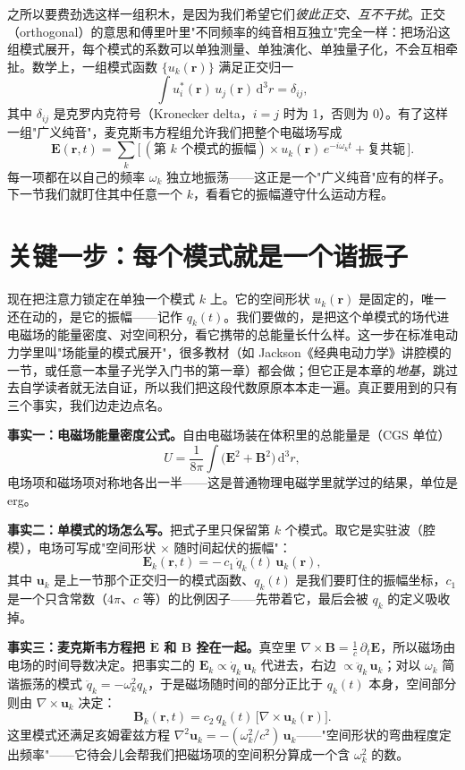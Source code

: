 之所以要费劲选这样一组积木，是因为我们希望它们\emph{彼此正交、互不干扰}。正交（orthogonal）的意思和傅里叶里"不同频率的纯音相互独立"完全一样：把场沿这组模式展开，每个模式的系数可以单独测量、单独演化、单独量子化，不会互相牵扯。数学上，一组模式函数 \(\{u_k(\bm r)\}\) 满足正交归一
\[
  \int u_i^*(\bm r)\,u_j(\bm r)\,\mathrm d^3r=\delta_{ij},
\]
其中 \(\delta_{ij}\) 是克罗内克符号（Kronecker delta，\(i=j\) 时为 1，否则为 0）。有了这样一组"广义纯音"，麦克斯韦方程组允许我们把整个电磁场写成
\[
  \bm E(\bm r,t)=\sum_k\big[\,(\text{第 }k\text{ 个模式的振幅})\times u_k(\bm r)\,e^{-i\omega_k t}+\text{复共轭}\,\big].
\]
每一项都在以自己的频率 \(\omega_k\) 独立地振荡——这正是一个"广义纯音"应有的样子。下一节我们就盯住其中任意一个 \(k\)，看看它的振幅遵守什么运动方程。

\section{关键一步：每个模式就是一个谐振子}
\label{sec:e05-mode-is-oscillator}

现在把注意力锁定在单独一个模式 \(k\) 上。它的空间形状 \(u_k(\bm r)\) 是固定的，唯一还在动的，是它的振幅——记作 \(q_k(t)\)。我们要做的，是把这个单模式的场代进电磁场的能量密度、对空间积分，看它携带的总能量长什么样。这一步在标准电动力学里叫"场能量的模式展开"，很多教材（如 Jackson《经典电动力学》讲腔模的一节，或任意一本量子光学入门书的第一章）都会做；但它正是本章的\emph{地基}，跳过去自学读者就无法自证，所以我们把这段代数原原本本走一遍。真正要用到的只有三个事实，我们边走边点名。

\textbf{事实一：电磁场能量密度公式。}自由电磁场装在体积里的总能量是（CGS 单位）
\[
  U=\frac{1}{8\pi}\int\big(\bm E^2+\bm B^2\big)\,\mathrm d^3r,
\]
电场项和磁场项对称地各出一半——这是普通物理电磁学里就学过的结果，单位是 erg。

\textbf{事实二：单模式的场怎么写。}把式子里只保留第 \(k\) 个模式。取它是实驻波（腔模），电场可写成"空间形状 \(\times\) 随时间起伏的振幅"：
\[
  \bm E_k(\bm r,t)=-\,c_1\,\dot q_k(t)\,\bm u_k(\bm r),
\]
其中 \(\bm u_k\) 是上一节那个正交归一的模式函数、\(q_k(t)\) 是我们要盯住的振幅坐标，\(c_1\) 是一个只含常数（\(4\pi\)、\(c\) 等）的比例因子——先带着它，最后会被 \(q_k\) 的定义吸收掉。

\textbf{事实三：麦克斯韦方程把 \(\dot{\bm E}\) 和 \(\bm B\) 拴在一起。}真空里 \(\nabla\times\bm B=\tfrac1c\,\partial_t\bm E\)，所以磁场由电场的时间导数决定。把事实二的 \(\bm E_k\propto\dot q_k\,\bm u_k\) 代进去，右边 \(\propto\ddot q_k\,\bm u_k\)；对以 \(\omega_k\) 简谐振荡的模式 \(\ddot q_k=-\omega_k^2 q_k\)，于是磁场随时间的部分正比于 \(q_k(t)\) 本身，空间部分则由 \(\nabla\times\bm u_k\) 决定：
\[
  \bm B_k(\bm r,t)=c_2\,q_k(t)\,\big[\nabla\times\bm u_k(\bm r)\big].
\]
这里模式还满足亥姆霍兹方程 \(\nabla^2\bm u_k=-(\omega_k^2/c^2)\,\bm u_k\)——"空间形状的弯曲程度定出频率"——它待会儿会帮我们把磁场项的空间积分算成一个含 \(\omega_k^2\) 的数。

